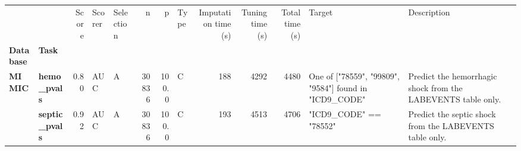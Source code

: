 \begin{tabular}{llrllrrlrrrll}
\toprule
     &            &  Score & Scorer & Selection &       n &      p & Type &  Imputation time (s) &  Tuning time (s) &  Total time (s) &                                                                                                                                                                                                                                                                                                                                                                                                                                                                                Target &                                                                                                        Description \\
\textbf{Database} & \textbf{Task} &        &        &           &         &        &      &                      &                  &                 &                                                                                                                                                                                                                                                                                                                                                                                                                                                                                       &                                                                                                                    \\
\midrule
\textbf{MIMIC} & \textbf{hemo\_pvals} &   0.80 &    AUC &         A &   30836 &  100.0 &    C &                  188 &             4292 &            4480 &                                                                                                                                                                                                                                                                                                                                                                                                                                One of ["78559", "99809", "9584"] found in "ICD9\_CODE" &                                                       Predict the hemorrhagic shock from the LABEVENTS table only. \\
     & \textbf{septic\_pvals} &   0.92 &    AUC &         A &   30836 &  100.0 &    C &                  193 &             4513 &            4706 &                                                                                                                                                                                                                                                                                                                                                                                                                                                                "ICD9\_CODE" == "78552" &                                                            Predict the septic shock from the LABEVENTS table only. \\

\end{tabular}
